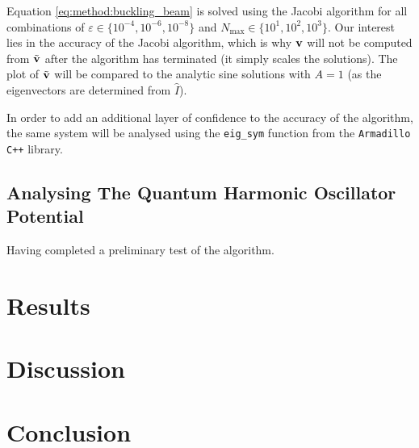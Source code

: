 \documentclass[reprint,english]{revtex4-1}
\begin{document}
Equation \eqref{eq:method:buckling_beam} is solved using the Jacobi algorithm for all combinations of \(\varepsilon\in\{10^{-4},10^{-6},10^{-8}\}\) and \(N_{\text{max}}\in\{10^1,10^2,10^3\}\). Our interest lies in the accuracy of the Jacobi algorithm, which is why \(\vb{v}\) will not be computed from \(\tilde{\vb{v}}\) after the algorithm has terminated (it simply scales the solutions). The plot of \(\tilde{\vb{v}}\) will be compared to the analytic sine solutions with \(A=1\) (as the eigenvectors are determined from \(\hat{I}\)).

In order to add an additional layer of confidence to the accuracy of the algorithm, the same system will be analysed using the \texttt{eig\_sym} function from the \texttt{Armadillo C++} library.
\subsection{Analysing The Quantum Harmonic Oscillator Potential}
Having completed a preliminary test of the algorithm.











\clearpage

\section{Results}


\section{Discussion}


\section{Conclusion}


\nocite{lecture_ode}\nocite{lecture_linalg}


\end{document}
